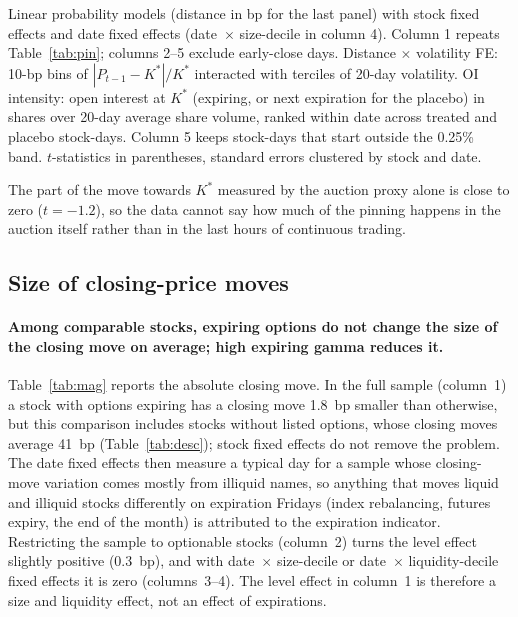 \documentclass[11pt,a4paper]{article}
\newcommand{\Kstar}{K^{*}}
\begin{document}
\begin{table}[ht]
\begin{threeparttable}
\begin{tabular}{lccccc}
\bottomrule
\end{tabular}
\begin{tablenotes}\footnotesize
\item Linear probability models (distance in bp for the last panel) with stock fixed effects and date fixed effects (date~$\times$ size-decile in column 4). Column 1 repeats Table~\ref{tab:pin}; columns 2--5 exclude early-close days. Distance $\times$ volatility FE: 10-bp bins of $|P_{t-1}-\Kstar|/\Kstar$ interacted with terciles of 20-day volatility. OI intensity: open interest at $\Kstar$ (expiring, or next expiration for the placebo) in shares over 20-day average share volume, ranked within date across treated and placebo stock-days. Column 5 keeps stock-days that start outside the 0.25\% band. $t$-statistics in parentheses, standard errors clustered by stock and date.
\end{tablenotes}
\end{threeparttable}
\end{table}

The part of the move towards $\Kstar$ measured by the auction proxy alone is close to zero ($t=-1.2$), so the data cannot say how much of the pinning happens in the auction itself rather than in the last hours of continuous trading.

\subsection{Size of closing-price moves}

\paragraph{Among comparable stocks, expiring options do not change the size of the closing move on average; high expiring gamma reduces it.} Table~\ref{tab:mag} reports the absolute closing move. In the full sample (column~1) a stock with options expiring has a closing move 1.8~bp smaller than otherwise, but this comparison includes stocks without listed options, whose closing moves average 41~bp (Table~\ref{tab:desc}); stock fixed effects do not remove the problem. The date fixed effects then measure a typical day for a sample whose closing-move variation comes mostly from illiquid names, so anything that moves liquid and illiquid stocks differently on expiration Fridays (index rebalancing, futures expiry, the end of the month) is attributed to the expiration indicator. Restricting the sample to optionable stocks (column~2) turns the level effect slightly positive (0.3~bp), and with date~$\times$ size-decile or date~$\times$ liquidity-decile fixed effects it is zero (columns~3--4). The level effect in column~1 is therefore a size and liquidity effect, not an effect of expirations.
\end{document}
